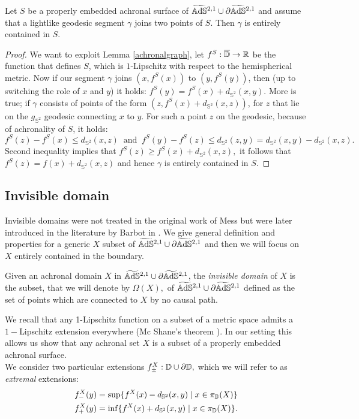 \begin{lemma}\label{containedgeo}
    Let $S$ be a properly embedded achronal surface of $\widetilde{\mathbb{A}\mathrm{d}\mathbb{S}}{}^{2,1}\cup\partial\widetilde{\mathbb{A}\mathrm{d}\mathbb{S}}{}^{2,1}$ and assume that a lightlike geodesic segment $\gamma$ joins two points of $S$. Then $\gamma$ is entirely contained in $S.$
\end{lemma}
\begin{proof}
    We want to exploit Lemma \ref{achronalgraph}, let $f^S:\overline{\mathbb{D}}\to\mathbb{R}$ be the function that defines $S$, which is $1$-Lipschitz with respect to the hemispherical metric. Now if our segment $\gamma$ joins $(x,f^S(x))$ to $(y,f^S(y))$, then (up to switching the role of $x$ and $y$) it holds: $f^S(y)=f^S(x)+d_{\mathbb{S}^2}(x,y).$ More is true; if $\gamma$ consists of points of the form $(z,f^S(x)+d_{\mathbb{S}^2}(x,z))$, for $z$ that lie on the $g_{\mathbb{S}^2}$ geodesic connecting $x$ to $y$. For such a point $z$ on the geodesic, because of achronality of $S$, it holds: 
        \[
            f^S(z)-f^S(x)\leq d_{\mathbb{S}^2}(x,z)\;\;\text{and}\;\;f^S(y)-f^S(z)\leq d_{\mathbb{S}^2}(z,y)=d_{\mathbb{S}^2}(x,y)-d_{\mathbb{S}^2}(x,z).
        \]
        Second inequality implies that $f^S(z)\geq f^S(x)+d_{\mathbb{S}^2}(x,z),$ it follows that $f^S(z)=f(x)+d_{\mathbb{S}^2}(x,z)$ and hence $\gamma$ is entirely contained in $S.$
\end{proof}

\subsection{Invisible domain}
Invisible domains were not treated in the original work of Mess but were later introduced in the literature by Barbot in \cite{barbot2008causal}. We give general definition and properties for a generic $X$ subset of $\widetilde{\mathbb{A}\mathrm{d}\mathbb{S}}{}^{2,1}\cup\partial  \widetilde{\mathbb{A}\mathrm{d}\mathbb{S}}{}^{2,1}$ and then we will focus on $X$ entirely contained in the boundary. 

\begin{definition}
    Given an achronal domain $X$ in $\widetilde{\mathbb{A}\mathrm{d}\mathbb{S}}{}^{2,1}\cup\partial\widetilde{\mathbb{A}\mathrm{d}\mathbb{S}}{}^{2,1}$, the \textit{invisible domain} of $X$ is the subset, that we will denote by $\Omega(X),$ of $\widetilde{\mathbb{A}\mathrm{d}\mathbb{S}}{}^{2,1}\cup\partial\widetilde{\mathbb{A}\mathrm{d}\mathbb{S}}{}^{2,1}$ defined as the set of points which are connected to $X$ by no causal path.   
\end{definition}

We recall that any 1-Lipschitz function on a subset of a metric space admits a $1-$Lipschitz extension everywhere (Mc Shane's theorem \cite{mcshane1934extension}). In our setting this allows us show that any achronal set $X$ is a subset of a properly embedded achronal surface.\\
We consider two particular extensions $f_\pm^X:\mathbb{D}\cup\partial\mathbb{D},$ which we will refer to as \textit{extremal} extensions:
\begin{align*}
    f_-^X(y)&=\sup\{f^X(x)-d_{\mathbb{S}^2}(x,y)\;|\;x\in\pi_{\mathbb{D}}(X)\}    \\
    f_+^X(y)&=\inf\{f^X(x)+d_{\mathbb{S}^2}(x,y)\;|\;x\in\pi_{\mathbb{D}}(X)\}.
\end{align*}
    
